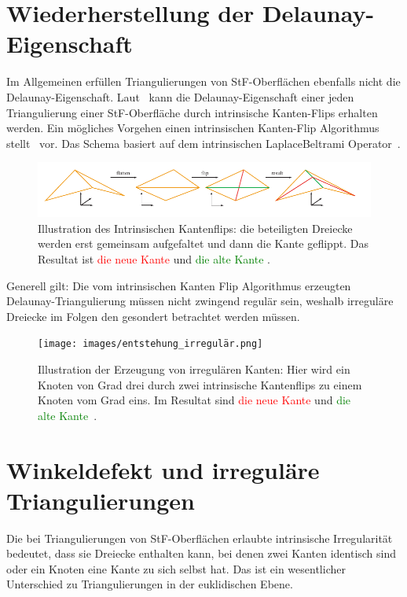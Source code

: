 \section*{Wiederherstellung der Delaunay-Eigenschaft}
Im Allgemeinen erfüllen Triangulierungen von StF-Oberflächen ebenfalls nicht die Delaunay-Eigenschaft. Laut~\citet{Bobenko:2007:LaplaceBeltrami} kann die Delaunay-Eigenschaft einer jeden Triangulierung einer StF-Oberfläche durch intrinsische Kanten-Flips erhalten werden.
Ein mögliches Vorgehen einen intrinsischen Kanten-Flip Algorithmus stellt~\citet{Bobenko:2006:SIGGRAPH} vor. Das Schema basiert auf dem intrinsischen LaplaceBeltrami Operator~\cite{Bobenko:2007:LaplaceBeltrami}.
 \begin{figure}[H]
    \centering
    \includegraphics[width=5in]{images/intrinische_Kantenflip.png}
    \caption{Illustration des Intrinsischen Kantenflips: die beteiligten Dreiecke werden erst gemeinsam  aufgefaltet und dann die Kante geflippt.  Das Resultat ist  \textcolor{red}{die neue Kante} und \textcolor{green}{die alte Kante}  \cite{Bobenko:2006:SIGGRAPH}. }%
\end{figure}
Generell gilt: Die vom intrinsischen Kanten Flip Algorithmus erzeugten Delaunay-Triangulierung müssen nicht zwingend regulär sein, weshalb irreguläre Dreiecke im Folgen den gesondert betrachtet werden müssen. 
 \begin{figure}[H]
    \centering
    \texttt{[image: images/entstehung\_irregulär.png]}
    \caption{Illustration der Erzeugung von irregulären Kanten: Hier wird ein Knoten von Grad drei durch zwei intrinsische Kantenflips zu einem Knoten vom Grad eins. Im Resultat sind \textcolor{red}{die neue Kante} und \textcolor{green}{die alte Kante}~\cite{Bobenko:2006:SIGGRAPH}. }%
\end{figure}



\section*{Winkeldefekt und irreguläre Triangulierungen}
Die bei Triangulierungen von StF-Oberflächen erlaubte intrinsische Irregularität bedeutet, dass sie Dreiecke enthalten kann, bei denen zwei Kanten identisch sind oder ein Knoten eine Kante zu sich selbst hat. Das ist ein wesentlicher Unterschied zu Triangulierungen in der euklidischen Ebene. \\

